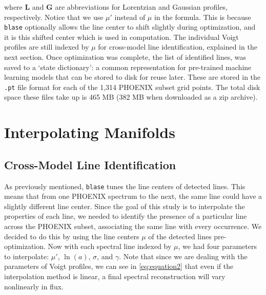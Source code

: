 \documentclass[twocolumn]{aastex631}
\begin{document}
where $\mathbf{L}$ and $\mathbf{G}$ are abbreviations for Lorentzian and Gaussian profiles, respectively. 
Notice that we use $\mu'$ instead of $\mu$ in the formula. 
This is because \texttt{blase} optionally allows the line center to shift slightly during optimization, and it is this shifted center which is used in computation. 
The individual Voigt profiles are still indexed by $\mu$ for cross-model line identification, explained in the next section. 
Once optimization was complete, the list of identified lines, was saved to a `state dictionary': a common representation for pre-trained machine learning models that can be stored to disk for reuse later. 
These are stored in the \texttt{.pt} file format for each of the 1,314 PHOENIX subset grid points. 
The total disk space these files take up is 465 MB (382 MB when downloaded as a zip archive).

\section{Interpolating Manifolds}
\subsection{Cross-Model Line Identification}
As previously mentioned, \texttt{blase} tunes the line centers of detected lines. 
This means that from one PHOENIX spectrum to the next, the same line could have a slightly different line center. 
Since the goal of this study is to interpolate the properties of each line, we needed to identify the presence of a particular line across the PHOENIX subset, associating the same line with every occurrence. 
We decided to do this by using the line centers $\mu$ of the detected lines pre-optimization. 
Now with each spectral line indexed by $\mu$, we had four parameters to interpolate: $\mu'$, $\ln(a)$, $\sigma$, and $\gamma$. 
Note that since we are dealing with the parameters of Voigt profiles, we can see in \autoref{eq:equation2} that even if the interpolation method is linear, a final spectral reconstruction will vary nonlinearly in flux.
\end{document}
